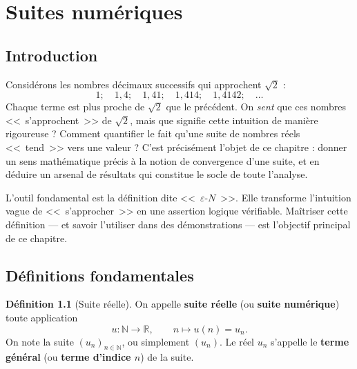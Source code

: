 \documentclass[12pt,a4paper,openany]{book}
\theoremstyle{definition}
\newtheorem{definition}{Définition}[chapter]
\newcommand{\N}{\mathbb{N}}
\newcommand{\R}{\mathbb{R}}
\newcommand{\eps}{\varepsilon}
\begin{document}


\chapter{Suites numériques}\label{chap:suites}

\section*{Introduction}

Considérons les nombres décimaux successifs qui approchent $\sqrt{2}$ :
\[
  1 ;\quad 1{,}4 ;\quad 1{,}41 ;\quad 1{,}414 ;\quad 1{,}4142 ;\quad \ldots
\]
Chaque terme est plus proche de $\sqrt{2}$ que le précédent. On \emph{sent} que ces
nombres <<~s'approchent~>> de $\sqrt{2}$, mais que signifie cette intuition de manière
rigoureuse ? Comment quantifier le fait qu'une suite de nombres réels <<~tend~>> vers
une valeur ? C'est précisément l'objet de ce chapitre : donner un sens mathématique
précis à la notion de convergence d'une suite, et en déduire un arsenal de résultats
qui constitue le socle de toute l'analyse.

\medskip

L'outil fondamental est la définition dite <<~$\eps$-$N$~>>. Elle transforme l'intuition
vague de <<~s'approcher~>> en une assertion logique vérifiable. Maîtriser cette définition
--- et savoir l'utiliser dans des démonstrations --- est l'objectif principal de ce chapitre.

\section{Définitions fondamentales}\label{sec:suites:def}

\begin{definition}[Suite réelle]\label{def:suite-reelle}
  On appelle \textbf{suite réelle} (ou \textbf{suite numérique}) toute application
  \[
    u : \N \longrightarrow \R, \qquad n \longmapsto u(n) = u_n.
  \]
  On note la suite $(u_n)_{n \in \N}$, ou simplement $(u_n)$. Le réel $u_n$ s'appelle
  le \textbf{terme général} (ou \textbf{terme d'indice $n$}) de la suite.
\end{definition}
\end{document}
